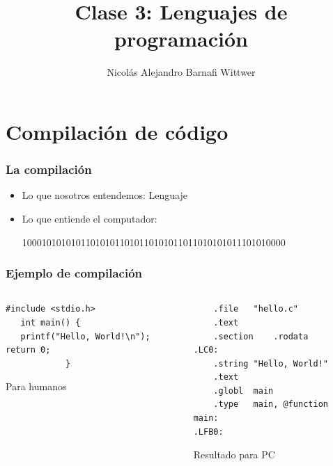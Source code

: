 \documentclass[14pt,aspectratio=169,xcolor=dvipsnames]{beamer}
\title[short title]{Clase 3: Lenguajes de programación}
\subtitle{}
\author[NA Barnafi] {Nicolás Alejandro Barnafi Wittwer}
\institute[UC|CMM] 
{
    Pontificia Universidad Católica de Chile \\
    Centro de Modelamiento Matemático
}
\begin{document}
\begin{frame}
    \maketitle
\end{frame}
\section{Compilación de código}
\begin{frame}[t]\frametitle{La compilación}

    \vspace{1cm}
    \begin{itemize}
        \item<+-> Lo que nosotros entendemos: Lenguaje
        \item<+-> Lo que entiende el computador: 
    
        100010101010110101011010110101011011010101011101010000
            
    \end{itemize}
\end{frame}
\begin{frame}[fragile]\frametitle{Ejemplo de compilación}
\begin{small}
    \begin{columns}
        \begin{column}[b]{0.4\textwidth}
            \begin{verbatim}
#include <stdio.h>
   int main() {
   printf("Hello, World!\n");
return 0;
            }
            \end{verbatim}

    \vfill
            Para humanos
        \end{column}
        \begin{column}[b]{0.45\textwidth}
        
            \begin{verbatim}
    .file	"hello.c"
    .text
    .section	.rodata
.LC0:
    .string	"Hello, World!"
    .text
    .globl	main
    .type	main, @function
main:
.LFB0:
            \end{verbatim}

    \vfill
            Resultado para PC
        \end{column}
    \end{columns}
\end{small}
\end{frame}
\end{document}
